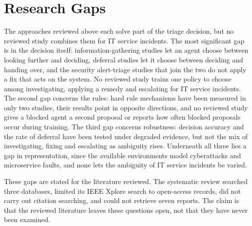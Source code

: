 \section{Research Gaps}
\label{ch02:sec:gaps}

The approaches reviewed above each solve part of the triage decision, but no reviewed study combines them for IT service incidents. The most significant gap is in the decision itself: information-gathering studies let an agent choose between looking further and deciding, deferral studies let it choose between deciding and handing over, and the security alert-triage studies that join the two do not apply a fix that acts on the system. No reviewed study trains one policy to choose among investigating, applying a remedy and escalating for IT service incidents. The second gap concerns the rules: hard rule mechanisms have been measured in only two studies, their results point in opposite directions, and no reviewed study gives a blocked agent a second proposal or reports how often blocked proposals occur during training. The third gap concerns robustness: decision accuracy and the rate of deferral have been tested under degraded evidence, but not the mix of investigating, fixing and escalating as ambiguity rises. Underneath all three lies a gap in representation, since the available environments model cyberattacks and microservice faults, and none lets the ambiguity of IT service incidents be varied.

These gaps are stated for the literature reviewed. The systematic review searched three databases, limited its IEEE Xplore search to open-access records, did not carry out citation searching, and could not retrieve seven reports. The claim is that the reviewed literature leaves these questions open, not that they have never been examined.

